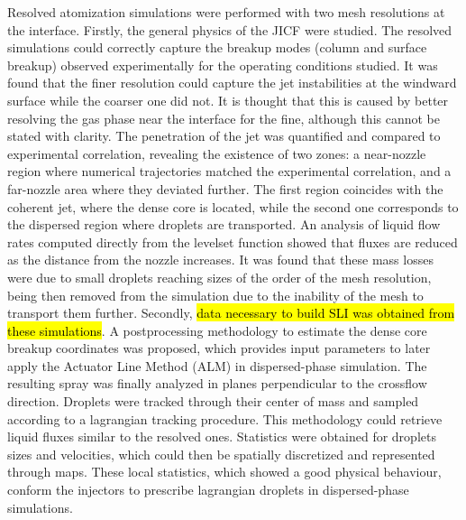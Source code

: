 Resolved atomization simulations were performed with two mesh resolutions at the interface. Firstly, the general physics of the JICF were studied. The resolved simulations could correctly capture the breakup modes (column and surface breakup) observed experimentally for the operating conditions studied. It was found that the finer resolution could capture the jet instabilities at the windward surface while the coarser one did not. It is thought that this is caused by better resolving the gas phase near the interface for the fine, {although this cannot be stated with clarity}. The penetration of the jet was quantified and compared to experimental correlation, revealing the existence of two zones: a near-nozzle region where numerical trajectories matched the experimental correlation, and a far-nozzle area where they deviated further. The first region coincides with the coherent jet, where the dense core is located, while the second one corresponds to the dispersed region where droplets are transported. An analysis of liquid flow rates computed directly from the levelset function showed that fluxes are reduced as the distance from the nozzle increases. It was found that these mass losses were due to small droplets reaching sizes of the order of the mesh resolution, being then removed from the simulation due to the inability of the mesh to transport them further. Secondly, \hl{data necessary to build SLI was obtained from these simulations}. A postprocessing methodology to estimate the dense core breakup coordinates was proposed, which provides input parameters to  later apply the Actuator Line Method (ALM) in dispersed-phase simulation. The resulting spray was finally analyzed in planes perpendicular to the crossflow direction. Droplets were tracked through their center of mass and sampled according to a lagrangian tracking procedure. This methodology could retrieve liquid fluxes similar to the resolved ones. Statistics were obtained for droplets sizes and velocities, which could then be spatially discretized and represented through maps. These local statistics, which showed a good physical behaviour, conform the injectors to prescribe lagrangian droplets in dispersed-phase simulations. \\

